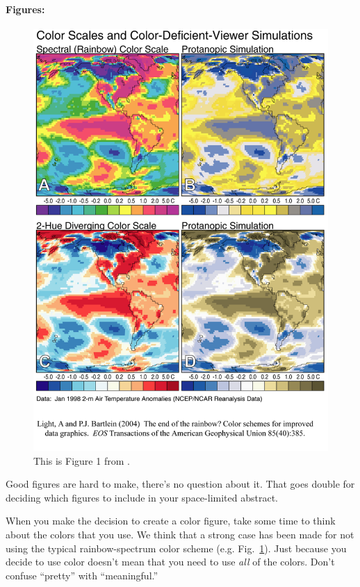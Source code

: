 \documentclass[twoside]{article}
\begin{document}
\paragraph{Figures:}

\begin{figure}
\centering
\includegraphics[width=\columnwidth]{lb_fig1.png}
\caption[Color Scales and Color-Deficient-Viewer Simulations]{
    \label{color_scales}
    This is Figure 1 from \citet{2004EOSTr..85..385L}.  
    }
\end{figure}

Good figures are hard to make, there's no question about it.  That
goes double for deciding which figures to include in your 
space-limited abstract.

When you make the decision to create a color figure, take some time
to think about the colors that you use.  We think that a 
strong case has been made \citep{2004EOSTr..85..385L,borland2007rainbow} for not using the
typical rainbow-spectrum color scheme (e.g. Fig.~\ref{color_scales}).
Just because you decide to use color doesn't mean that you need to
use \emph{all} of the colors.  Don't confuse ``pretty'' with
``meaningful.''
\end{document}
